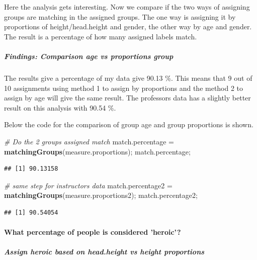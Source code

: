 \documentclass[]{article}
\newenvironment{Shaded}{\begin{snugshade}}{\end{snugshade}}
\newcommand{\CommentTok}[1]{\textcolor[rgb]{0.56,0.35,0.01}{\textit{#1}}}
\newcommand{\KeywordTok}[1]{\textcolor[rgb]{0.13,0.29,0.53}{\textbf{#1}}}
\newcommand{\NormalTok}[1]{#1}
\newcommand{\StringTok}[1]{\textcolor[rgb]{0.31,0.60,0.02}{#1}}
\begin{document}
Here the analysis gets interesting. Now we compare if the two ways of
assigning groups are matching in the assigned groups. The one way is
assigning it by proportions of height/head.height and gender, the other
way by age and gender. The result is a percentage of how many assigned
labels match.

\subparagraph{Findings: Comparison age vs proportions group}
\label{sec:appendix-findings-comparison-age-vs-proportions-group}

The results give a percentage of my data give 90.13 \%. This means that
9 out of 10 assignments using method 1 to assign by proportions and the
method 2 to assign by age will give the same result. The professors data
has a slightly better result on this analysis with 90.54 \%.

Below the code for the comparison of group age and group proportions is
shown.

\begin{Shaded}
\begin{Highlighting}[]
\CommentTok{\# Do the 2 groups assigned match}
\NormalTok{match.percentage =}\StringTok{ }\KeywordTok{matchingGroups}\NormalTok{(measure.proportions);}
\NormalTok{match.percentage;}
\end{Highlighting}
\end{Shaded}

\begin{verbatim}
## [1] 90.13158
\end{verbatim}

\begin{Shaded}
\begin{Highlighting}[]
\CommentTok{\# same step for instructors data}
\NormalTok{match.percentage2 =}\StringTok{ }\KeywordTok{matchingGroups}\NormalTok{(measure.proportions2);}
\NormalTok{match.percentage2;}
\end{Highlighting}
\end{Shaded}

\begin{verbatim}
## [1] 90.54054
\end{verbatim}

\newpage

\paragraph{What percentage of people is considered 'heroic'?}
\label{sec:appendix-heroic}

\subparagraph{Assign heroic based on head.height vs height proportions}
\label{sec:appendix-heroic-proportions}
\end{document}
